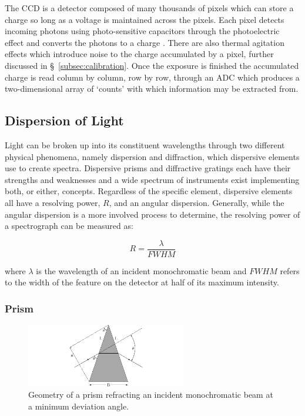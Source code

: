 The \gls{CCD} is a detector composed of many thousands of pixels which can store a charge so long as a voltage is maintained across the pixels. Each pixel detects incoming photons using photo-sensitive capacitors through the photoelectric effect and converts the photons to a charge \citep{CCDastronomy}. There are also thermal agitation effects which introduce noise to the charge accumulated by a pixel, further discussed in \S~\ref{subsec:calibration}. Once the exposure is finished the accumulated charge is read column by column, row by row, through an \gls{ADC}  which produces a two-dimensional array of `counts' with which information may be extracted from.

\subsection{Dispersion of Light} \label{subsec:dispersion}

Light can be broken up into its constituent wavelengths through two different physical phenomena, namely dispersion and diffraction, which dispersive elements use to create spectra. Dispersive prisms and diffractive gratings each have their strengths and weaknesses and a wide spectrum of instruments exist implementing both, or either, concepts. Regardless of the specific element, dispersive elements all have a resolving power, $R$, and an angular dispersion. Generally, while the angular dispersion is a more involved process to determine, the resolving power of a spectrograph can be measured as:

\begin{equation}
  R = \frac{\lambda}{FWHM}
  \label{eq:resolving_power}
\end{equation}

\noindent where $\lambda$ is the wavelength of an incident monochromatic beam and $FWHM$ refers to the width of the feature on the detector at half of its maximum intensity.

\subsubsection{Prism} \label{subsubsec:prism}

\begin{figure}[t]
  \centering
  \includegraphics[width = 7cm]{figures/2_prism_diagram.pdf}
  \caption{Geometry of a prism refracting an incident monochromatic beam at a minimum deviation angle.}
  \label{fig:prism_diagram}
\end{figure}

